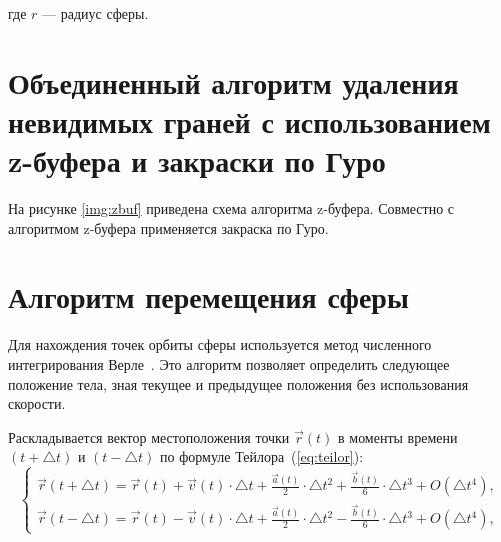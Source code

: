 \noindent где $r$ --- радиус сферы.



\section{Объединенный алгоритм удаления невидимых граней с использованием z-буфера и закраски по Гуро}

На рисунке \ref{img:zbuf} приведена схема алгоритма z-буфера. Совместно с алгоритмом z-буфера применяется закраска по Гуро.



\section{Алгоритм перемещения сферы}

Для нахождения точек орбиты сферы используется метод численного интегрирования Верле~\cite{verle}. Это алгоритм позволяет определить следующее положение тела, зная текущее и предыдущее положения без использования скорости.

Раскладывается вектор местоположения точки $\overrightarrow{r}(t)$ в моменты времени $(t + \bigtriangleup{t})$ и $(t - \bigtriangleup{t})$ по формуле Тейлора~(\ref{eq:teilor}):
    \begin{equation}\label{eq:teilor}
        \begin{cases}
	    \overrightarrow{r}(t + \bigtriangleup{t}) = \overrightarrow{r}(t) + \overrightarrow{v}(t) \cdot \bigtriangleup{t} + \frac{\overrightarrow{a}(t)}{2} \cdot \bigtriangleup{t}^2 + \frac{\overrightarrow{b}(t)}{6} \cdot \bigtriangleup{t}^3+ O(\bigtriangleup{t}^4),\\
            \overrightarrow{r}(t - \bigtriangleup{t}) = \overrightarrow{r}(t) - \overrightarrow{v}(t) \cdot \bigtriangleup{t} + \frac{\overrightarrow{a}(t)}{2} \cdot \bigtriangleup{t}^2 - \frac{\overrightarrow{b}(t)}{6} \cdot \bigtriangleup{t}^3+ O(\bigtriangleup{t}^4),
        \end{cases}
    \end{equation}

